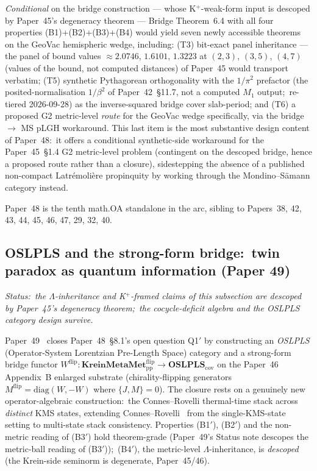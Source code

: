 \documentclass[11pt,a4paper]{article}
\theoremstyle{plain}
\theoremstyle{definition}
\begin{document}
\emph{Conditional} on the bridge construction --- whose K$^{+}$-weak-form
input is descoped by Paper~45's degeneracy theorem --- Bridge Theorem~6.4
with all four properties (B1)+(B2)+(B3)+(B4) would yield seven newly
accessible theorems on the GeoVac hemispheric wedge, including:
(T3) bit-exact panel inheritance --- the
panel of bound values $\approx 2.0746$, $1.6101$, $1.3223$ at
$(2,3)$, $(3,5)$, $(4,7)$ (values of the bound, not computed distances) of Paper~45 would transport verbatim; (T5) synthetic Pythagorean
orthogonality with the $1/\pi^{2}$ prefactor (the posited-normalisation
$1/\beta^{2}$ of Paper~42~\S 11.7, not a computed $M_{1}$ output;\ re-tiered
2026-09-28) as the inverse-squared bridge cover slab-period; and
(T6) a proposed G2 metric-level \emph{route} for the GeoVac wedge
specifically, via the bridge $\to$ MS pLGH workaround.  This last item
is the most substantive design content of Paper~48:\ it offers a
conditional synthetic-side workaround for the
Paper~45~\S 1.4 G2 metric-level problem (contingent on the descoped
bridge, hence a proposed route rather than a closure), sidestepping
the absence of a published non-compact Latr\'emoli\`ere propinquity by
working through the Mondino--S\"amann category instead.

Paper~48 is the tenth math.OA standalone in the arc, sibling to
Papers~38, 42, 43, 44, 45, 46, 47, 29, 32, 40.

\subsection{OSLPLS and the strong-form bridge:\ twin paradox as
quantum information (Paper 49)}
\label{sec:closures_paper49}

\emph{Status:\ the $\Lambda$-inheritance and
K$^{+}$-framed claims of this subsection are descoped by
Paper~45's degeneracy theorem;\ the cocycle-deficit algebra and the
OSLPLS category design survive.}

Paper~49~\cite{paper49} closes Paper~48~\S 8.1's open question Q1$'$
by constructing an \emph{OSLPLS} (Operator-System Lorentzian
Pre-Length Space) category and a strong-form bridge functor
$W^{\mathrm{flip}}: \mathbf{KreinMetaMet}_{\mathrm{pp}}^{\mathrm{flip}}
\to \mathbf{OSLPLS}_{\mathrm{cov}}$ on the Paper~46 Appendix~B enlarged
substrate (chirality-flipping generators
$M^{\mathrm{flip}} = \mathrm{diag}(W, -W)$ where $\{J, M\} = 0$).
The closure rests on a genuinely new operator-algebraic construction:\
the Connes--Rovelli thermal-time stack across \emph{distinct} KMS
states, extending Connes--Rovelli~\cite{connes_rovelli1994} from the
single-KMS-state setting to multi-state stack consistency.  Properties (B1$'$), (B2$'$) and the non-metric reading of (B3$'$) hold theorem-grade (Paper~49's Status note descopes the metric-ball reading of (B3$'$));\ (B4$'$), the
metric-level $\Lambda$-inheritance, is \emph{descoped} (the Krein-side seminorm is degenerate, Paper~45/46).
\end{document}
